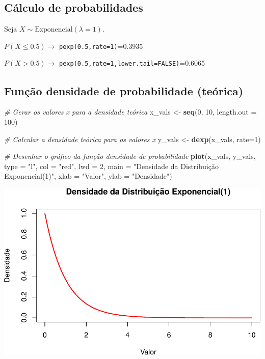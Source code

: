 \documentclass[
]{book}
\newenvironment{Shaded}{\begin{snugshade}}{\end{snugshade}}
\newcommand{\AttributeTok}[1]{\textcolor[rgb]{0.13,0.29,0.53}{#1}}
\newcommand{\CommentTok}[1]{\textcolor[rgb]{0.56,0.35,0.01}{\textit{#1}}}
\newcommand{\DecValTok}[1]{\textcolor[rgb]{0.00,0.00,0.81}{#1}}
\newcommand{\FunctionTok}[1]{\textcolor[rgb]{0.13,0.29,0.53}{\textbf{#1}}}
\newcommand{\NormalTok}[1]{#1}
\newcommand{\OtherTok}[1]{\textcolor[rgb]{0.56,0.35,0.01}{#1}}
\newcommand{\StringTok}[1]{\textcolor[rgb]{0.31,0.60,0.02}{#1}}
\begin{document}
\subsection{Cálculo de probabilidades}\label{cuxe1lculo-de-probabilidades-3}

Seja \(X\sim \text{Exponencial}(\lambda=1)\).

\(P(X\leq 0.5) \to\) \texttt{pexp(0.5,rate=1)}=0.3935

\(P(X > 0.5) \to\) \texttt{pexp(0.5,rate=1,lower.tail=FALSE)}=0.6065

\subsection{Função densidade de probabilidade (teórica)}\label{funuxe7uxe3o-densidade-de-probabilidade-teuxf3rica}

\begin{Shaded}
\begin{Highlighting}[]
\CommentTok{\# Gerar os valores x para a densidade teórica}
\NormalTok{x\_vals }\OtherTok{\textless{}{-}} \FunctionTok{seq}\NormalTok{(}\DecValTok{0}\NormalTok{, }\DecValTok{10}\NormalTok{, }\AttributeTok{length.out =} \DecValTok{100}\NormalTok{)}

\CommentTok{\# Calcular a densidade teórica para os valores x}
\NormalTok{y\_vals }\OtherTok{\textless{}{-}} \FunctionTok{dexp}\NormalTok{(x\_vals, }\AttributeTok{rate=}\DecValTok{1}\NormalTok{)}

\CommentTok{\# Desenhar o gráfico da função densidade de probabilidade}
\FunctionTok{plot}\NormalTok{(x\_vals, y\_vals, }\AttributeTok{type =} \StringTok{"l"}\NormalTok{, }
     \AttributeTok{col =} \StringTok{"red"}\NormalTok{, }\AttributeTok{lwd =} \DecValTok{2}\NormalTok{, }
     \AttributeTok{main =} \StringTok{"Densidade da Distribuição Exponencial(1)"}\NormalTok{,}
     \AttributeTok{xlab =} \StringTok{"Valor"}\NormalTok{, }\AttributeTok{ylab =} \StringTok{"Densidade"}\NormalTok{)}
\end{Highlighting}
\end{Shaded}

\includegraphics{meuLivro2_files/figure-latex/unnamed-chunk-128-1.pdf}
\end{document}
